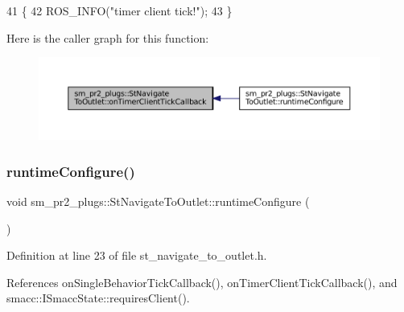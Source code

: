 \begin{DoxyCode}
41     \{
42         ROS\_INFO(\textcolor{stringliteral}{"timer client tick!"});
43     \}
\end{DoxyCode}
Here is the caller graph for this function\+:
\nopagebreak
\begin{figure}[H]
\begin{center}
\leavevmode
\includegraphics[width=350pt]{structsm__pr2__plugs_1_1StNavigateToOutlet_ab990f0f422deb0ef6dd4fcce9cb2823b_icgraph}
\end{center}
\end{figure}
\mbox{\label{structsm__pr2__plugs_1_1StNavigateToOutlet_aa36e4f478b3dc1c2b8fae6ef51f4d4f8}} 
\subsubsection{\texorpdfstring{runtime\+Configure()}{runtimeConfigure()}}
{\footnotesize\ttfamily void sm\+\_\+pr2\+\_\+plugs\+::\+St\+Navigate\+To\+Outlet\+::runtime\+Configure (\begin{DoxyParamCaption}{ }\end{DoxyParamCaption})\hspace{0.3cm}{\ttfamily [inline]}}



Definition at line 23 of file st\+\_\+navigate\+\_\+to\+\_\+outlet.\+h.



References on\+Single\+Behavior\+Tick\+Callback(), on\+Timer\+Client\+Tick\+Callback(), and smacc\+::\+I\+Smacc\+State\+::requires\+Client().


